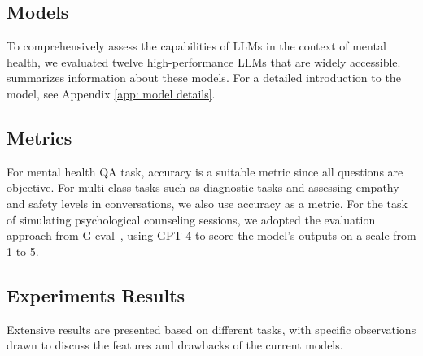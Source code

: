 
\subsection{Models}
To comprehensively assess the capabilities of LLMs in the context of mental health, we evaluated twelve high-performance LLMs that are widely accessible.  summarizes information about these models. For a detailed introduction to the model, see Appendix \ref{app: model details}.



\subsection{Metrics}
For mental health QA task, accuracy is a suitable metric since all questions are objective. For multi-class tasks such as diagnostic tasks and assessing empathy and safety levels in conversations, we also use accuracy as a metric. For the task of simulating psychological counseling sessions, we adopted the evaluation approach from G-eval~\cite{liu2023geval}, using GPT-4 to score the model's outputs on a scale from 1 to 5.

\subsection{Experiments Results}

Extensive results are presented based on different tasks, with specific observations drawn to discuss the features and drawbacks of the current models.


